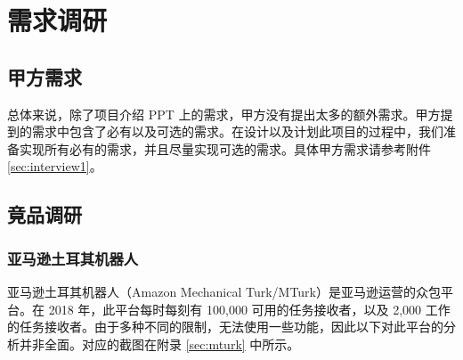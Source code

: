 \section{需求调研}

\subsection{甲方需求}

总体来说，除了项目介绍 PPT 上的需求，甲方没有提出太多的额外需求。甲方提到的需求中包含了必有以及可选的需求。在设计以及计划此项目的过程中，我们准备实现所有必有的需求，并且尽量实现可选的需求。具体甲方需求请参考附件 \ref{sec:interview1}。

\newpage

\subsection{竟品调研}

\subsubsection{亚马逊土耳其机器人}

亚马逊土耳其机器人（Amazon Mechanical Turk/MTurk）是亚马逊运营的众包平台。在 2018 年，此平台每时每刻有 100,000 可用的任务接收者，以及 2,000 工作的任务接收者。由于多种不同的限制，无法使用一些功能，因此以下对此平台的分析并非全面。对应的截图在附录 \ref{sec:mturk} 中所示。

